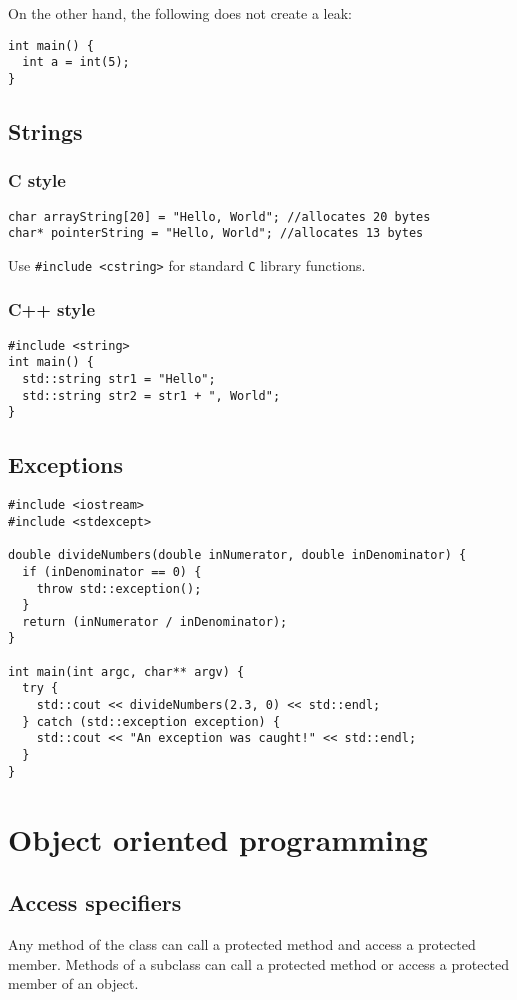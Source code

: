 \documentclass[a4paper,12pt]{article}
\begin{document}
On the other hand, the following does not create a leak:
\begin{lstlisting}[caption={No memory leak}]
int main() {
  int a = int(5);
}
\end{lstlisting}

\subsection{Strings}
\subsubsection{C style}
\begin{lstlisting}
char arrayString[20] = "Hello, World"; //allocates 20 bytes
char* pointerString = "Hello, World"; //allocates 13 bytes
\end{lstlisting}

Use \lstinline|#include <cstring>| for standard \verb|C| library functions.
\subsubsection{C++ style}
\begin{lstlisting}
#include <string>
int main() {
  std::string str1 = "Hello";
  std::string str2 = str1 + ", World";
}
\end{lstlisting}
\subsection{Exceptions}
\begin{lstlisting}
#include <iostream>
#include <stdexcept>

double divideNumbers(double inNumerator, double inDenominator) {
  if (inDenominator == 0) {
    throw std::exception();
  }
  return (inNumerator / inDenominator);
}

int main(int argc, char** argv) {
  try {
    std::cout << divideNumbers(2.3, 0) << std::endl;
  } catch (std::exception exception) {
    std::cout << "An exception was caught!" << std::endl;
  }
}
\end{lstlisting}

\section{Object oriented programming}
\subsection{Access specifiers}
Any method of the class can call a protected method and access a protected member. Methods of a subclass can call a protected method or access a protected member of an object.
\end{document}
